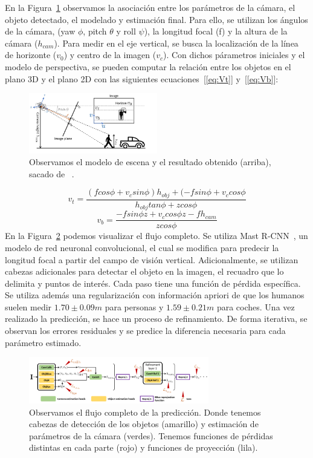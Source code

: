 \documentclass[12pt,letterpaper]{article}
\begin{document}
En la Figura~\ref{fig:Geometria} observamos la asociación entre los parámetros de la cámara, el objeto detectado, el modelado y estimación final.
Para ello, se utilizan los ángulos de la cámara, (yaw $\phi$, pitch $\theta$ y roll $\psi$), la longitud focal (f) y la altura de la cámara ($h_{cam}$). Para medir en el eje vertical, se busca 
la localización de la línea de horizonte ($v_0$) y centro de la imagen ($v_c$).
Con dichos párametros iniciales y el modelo de perspectiva, se pueden computar la relación entre los objetos en el plano 3D y el plano 2D con las siguientes ecuaciones~[\ref{eq:Vt}] y~[\ref{eq:Vb}]:
\begin{figure}[!ht]
\begin{center}
    \includegraphics[width=0.5\textwidth]{Geometria}
\end{center}
\caption{Observamos el modelo de escena y el resultado obtenido (arriba), sacado de ~\cite{SingleViewMetrology}.}
\label{fig:Geometria}
\end{figure}
\begin{equation}
v_t = \frac{(fcos\phi+v_csin\phi)h_{obj} + (-fsin\phi + v_ccos\phi}{h_{obj}tan\phi + zcos\phi}
\label{eq:Vt}
\end{equation}
\begin{equation}
v_b = \frac{-fsin\phi z+v_ccos\phi z -fh_{cam}}{zcos\phi}
\label{eq:Vb}
\end{equation}
En la Figura~\ref{fig:Pipeline} podemos visualizar el flujo completo. Se utiliza Mast R-CNN~\cite{MaskRCNN}, un modelo de red neuronal convolucional, el cual se modifica para 
predecir la longitud focal a partir del campo de visión vertical. Adicionalmente, se utilizan cabezas adicionales para detectar el objeto en 
la imagen, el recuadro que lo delimita y puntos de interés. Cada paso tiene una función de pérdida específica. Se utiliza además una 
regularización con información apriori de que los humanos suelen medir $1.70\pm0.09m$ para personas y $1.59\pm0.21m$ para coches.
Una vez realizado la predicción, se hace un proceso de refinamiento. De forma iterativa, se observan los errores residuales y se predice la diferencia 
necesaria para cada parámetro estimado.
\begin{figure}[!ht]
\begin{center}
    \includegraphics[width=0.7\textwidth]{Pipeline}
\end{center}
\caption{Observamos el flujo completo de la predicción. Donde tenemos cabezas de detección de los objetos (amarillo) y estimación de parámetros de
la cámara (verdes). Tenemos funciones de pérdidas distintas en cada parte (rojo) y funciones de proyección (lila).}
\label{fig:Pipeline}
\end{figure}
\end{document}
